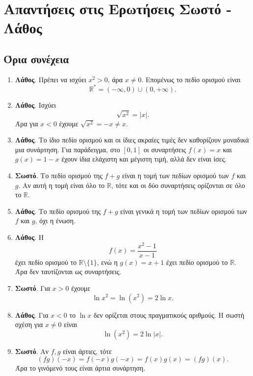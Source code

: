 \section{Απαντήσεις στις Ερωτήσεις Σωστό - Λάθος}

\subsection{Όρια συνέχεια}

\begin{enumerate}[label=\textbf{1.\arabic*.}]
\item \textbf{Λάθος}. Πρέπει να ισχύει $x^2>0$, άρα $x\neq0$. Επομένως το πεδίο ορισμού είναι
\[
\mathbb{R}^*=(-\infty,0)\cup(0,+\infty).
\]

\item \textbf{Λάθος}. Ισχύει
\[
\sqrt{x^2}=|x|.
\]
Άρα για $x<0$ έχουμε $\sqrt{x^2}=-x\neq x$.

\item \textbf{Λάθος}. Το ίδιο πεδίο ορισμού και οι ίδιες ακραίες τιμές δεν καθορίζουν μοναδικά μια συνάρτηση. Για παράδειγμα, στο $[0,1]$ οι συναρτήσεις $f(x)=x$ και $g(x)=1-x$ έχουν ίδια ελάχιστη και μέγιστη τιμή, αλλά δεν είναι ίσες.

\item \textbf{Σωστό}. Το πεδίο ορισμού της $f+g$ είναι η τομή των πεδίων ορισμού των $f$ και $g$. Αν αυτή η τομή είναι όλο το $\mathbb{R}$, τότε και οι δύο συναρτήσεις ορίζονται σε όλο το $\mathbb{R}$.

\item \textbf{Λάθος}. Το πεδίο ορισμού της $f+g$ είναι γενικά η τομή των πεδίων ορισμού των $f$ και $g$, όχι η ένωση.

\item \textbf{Λάθος}. Η
\[
f(x)=\frac{x^2-1}{x-1}
\]
έχει πεδίο ορισμού το $\mathbb{R}\setminus\{1\}$, ενώ η $g(x)=x+1$ έχει πεδίο ορισμού το $\mathbb{R}$. Άρα δεν ταυτίζονται ως συναρτήσεις.

\item \textbf{Σωστό}. Για $x>0$ έχουμε
\[
\ln x^2=\ln(x^2)=2\ln x.
\]

\item \textbf{Λάθος}. Για $x<0$ το $\ln x$ δεν ορίζεται στους πραγματικούς αριθμούς. Η σωστή σχέση για $x\neq0$ είναι
\[
\ln(x^2)=2\ln|x|.
\]

\item \textbf{Σωστό}. Αν $f,g$ είναι άρτιες, τότε
\[
(fg)(-x)=f(-x)g(-x)=f(x)g(x)=(fg)(x).
\]
Άρα το γινόμενό τους είναι άρτια συνάρτηση.


\end{enumerate}
